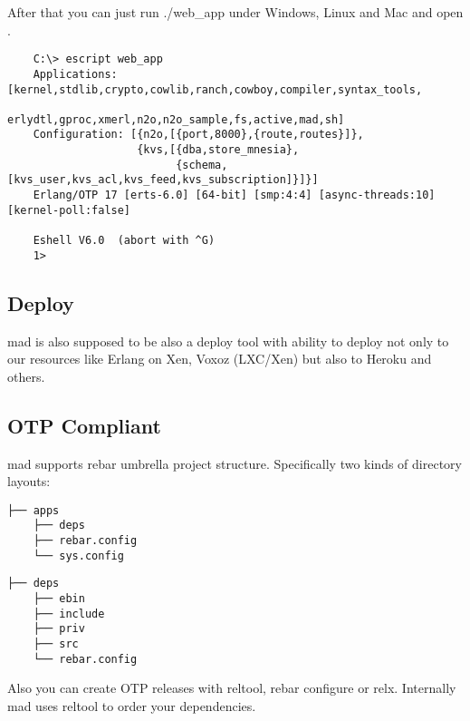 After that you can just run ./web_app under Windows, Linux and
Mac and open .

\vspace{1\baselineskip}
\begin{lstlisting}
    C:\> escript web_app
    Applications: [kernel,stdlib,crypto,cowlib,ranch,cowboy,compiler,syntax_tools,
                   erlydtl,gproc,xmerl,n2o,n2o_sample,fs,active,mad,sh]
    Configuration: [{n2o,[{port,8000},{route,routes}]},
                    {kvs,[{dba,store_mnesia},
                          {schema,[kvs_user,kvs_acl,kvs_feed,kvs_subscription]}]}]
    Erlang/OTP 17 [erts-6.0] [64-bit] [smp:4:4] [async-threads:10] [kernel-poll:false]

    Eshell V6.0  (abort with ^G)
    1>
\end{lstlisting}
\vspace{1\baselineskip}

\subsection{Deploy}

mad is also supposed to be also a deploy tool with ability to
deploy not only to our resources like Erlang on Xen, Voxoz (LXC/Xen) but
also to Heroku and others.

\subsection{OTP Compliant}

mad supports rebar umbrella project structure.
Specifically two kinds of directory layouts:

\vspace{1\baselineskip}
\begin{lstlisting}[caption=Solution]
    ├── apps
    ├── deps
    ├── rebar.config
    └── sys.config
\end{lstlisting}
\vspace{1\baselineskip}

\vspace{1\baselineskip}
\begin{lstlisting}[caption=OTP Application]
    ├── deps
    ├── ebin
    ├── include
    ├── priv
    ├── src
    └── rebar.config
\end{lstlisting}
\vspace{1\baselineskip}

Also you can create OTP releases with reltool, rebar configure or relx.
Internally mad uses reltool to order your dependencies.

